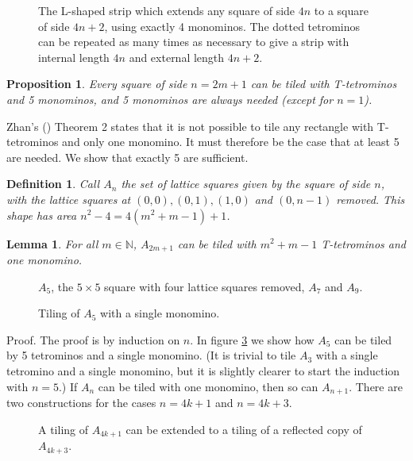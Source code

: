 \documentclass{article}
\theoremstyle{plain}
\newtheorem{proposition}[theorem]{Proposition}
\newtheorem{lemma}[theorem]{Lemma}
\newtheorem{definition}[theorem]{Definition}
\begin{document}
\begin{figure}

\caption{The L-shaped strip which extends any square of side $4n$ to a square of side $4n+2$, using exactly 4 monominos. The dotted tetrominos can be repeated as many times as necessary to give a strip with internal length $4n$ and external length $4n + 2$.}
\label{lshaped}
\end{figure}

\begin{proposition}\label{odd}
Every square of side $n = 2m + 1$ can be tiled with T-tetrominos and 5 monominos, and 5 monominos are always needed (except for $n = 1$).
\end{proposition}
Zhan's (\cite{zhan}) Theorem 2 states that it is not possible to tile any rectangle with T-tetrominos and only one monomino. It must therefore be the case that at least 5 are needed. We show that exactly 5 are sufficient.

\begin{definition}
Call $A_n$ the set of lattice squares given by the square of side $n$, with the lattice squares at $(0, 0), (0,1), (1, 0)$ and $(0, n-1)$ removed.
This shape has area $n^2 - 4 = 4(m^2 + m - 1) + 1$.
\end{definition}

\begin{lemma}
For all $m \in \mathbb{N}$, $A_{2m+1}$ can be tiled with $m^2 + m - 1$ T-tetrominos and one monomino.
\end{lemma}

\begin{figure}

\caption{$A_5$, the $5 \times 5$ square with four lattice squares removed, $A_7$ and $A_9$.}
\label{cropped}
\end{figure}

\begin{figure}

\caption{Tiling of $A_5$ with a single monomino.}
\label{five}
\end{figure}

{\sc Proof.}
The proof is by induction on $n$. In figure \ref{five} we show how $A_5$ can be tiled by 5 tetrominos and a single monomino. (It is trivial to tile $A_3$ with a single tetromino and a single monomino, but it is slightly clearer to start the induction with $n=5$.) If $A_n$ can be tiled with one monomino, then so can $A_{n+1}$. There are two constructions for the cases $n=4k+1$ and $n=4k+3$.

\begin{figure}

\caption{A tiling of $A_{4k+1}$ can be extended to a tiling of a reflected copy of $A_{4k+3}$.}
\label{ones}
\end{figure}
\end{document}
